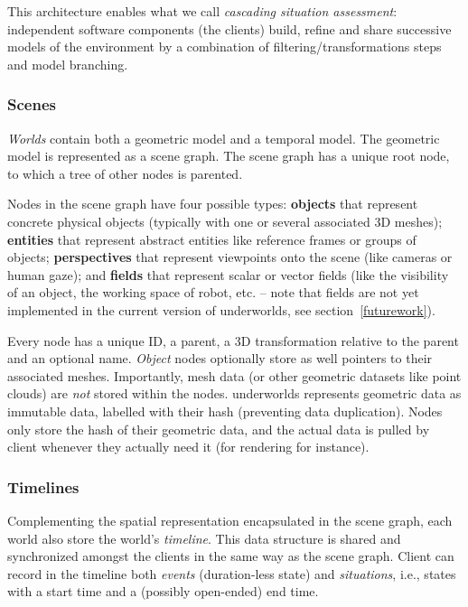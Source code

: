 \documentclass[letterpaper, 10 pt, conference]{ieeeconf}  %
\newcommand{\ie}{i.e.,\xspace}
\newcommand{\uwds}{{\sc underworlds}\xspace}
\begin{document}
This architecture enables what we call \emph{cascading situation assessment}:
independent software components (the clients) build, refine and share successive
models of the environment by a combination of filtering/transformations steps
and model branching.

\subsubsection{Scenes}

\emph{Worlds} contain both a geometric model and a temporal model. The geometric
model is represented as a scene graph. The scene graph has a unique root node,
to which a tree of other nodes is parented.

Nodes in the scene graph have four possible types: \textbf{objects} that represent
concrete physical objects (typically with one or several associated 3D meshes);
\textbf{entities} that represent abstract entities like reference frames or
groups of objects; \textbf{perspectives} that represent viewpoints onto the
scene (like cameras or human gaze); and \textbf{fields} that represent scalar or
vector fields (like the visibility of an object, the working space of robot,
etc. -- note that fields are not yet implemented in the current version of
\uwds, see section~\ref{futurework}).

Every node has a unique ID, a parent, a 3D transformation relative to the parent
and an optional name. \emph{Object} nodes optionally store as well pointers to their
associated meshes. Importantly, mesh data (or other geometric datasets like
point clouds) are \emph{not} stored within the nodes. \uwds represents geometric
data as immutable data, labelled with their hash (preventing data duplication).
Nodes only store the hash of their geometric data, and the actual data is pulled
by client whenever they actually need it (for rendering for instance).

\subsubsection{Timelines}

Complementing the spatial representation encapsulated in the scene graph, each
world also store the world's \emph{timeline}. This data structure is shared
and synchronized amongst the clients in the same way as the scene graph.
Client can record in the timeline both \emph{events} (duration-less state) and
\emph{situations}, \ie states with a start time and a (possibly open-ended) end time.
\end{document}
